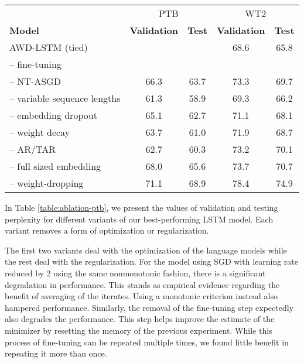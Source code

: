 \documentclass{article}
\begin{document}
\begin{table*}
\center
\begin{tabular}{l|cc|cc}
\toprule
 & \multicolumn{2}{c|}{PTB} & \multicolumn{2}{c}{WT2} \\
\bf Model & \bf Validation &  \bf Test & \bf Validation &  \bf Test \\
\midrule

AWD-LSTM (tied) &  &  & 68.6 & 65.8\\
\midrule
-- fine-tuning &  &  &  &  \\
-- NT-ASGD & 66.3 & 63.7 & 73.3 & 69.7 \\
\midrule
-- variable sequence lengths & 61.3 & 58.9 & 69.3 & 66.2 \\
-- embedding dropout & 65.1 & 62.7 & 71.1 & 68.1 \\
-- weight decay & 63.7 & 61.0 & 71.9 & 68.7 \\
-- AR/TAR & 62.7 & 60.3 & 73.2 & 70.1 \\ 
-- full sized embedding & 68.0 & 65.6 & 73.7 & 70.7 \\
-- weight-dropping & 71.1 & 68.9 & 78.4 & 74.9 \\
\bottomrule
\end{tabular}
\caption{
Model ablations for our best LSTM models reporting results over the validation and test set on Penn Treebank and WikiText-2.
Ablations are split into optimization and regularization variants, sorted according to the achieved validation perplexity on WikiText-2.
}
\label{table:ablation-ptb}
\end{table*}

In Table \ref{table:ablation-ptb}, we present the values of validation and testing perplexity for different variants of our best-performing LSTM model.
Each variant removes a form of optimization or regularization.

The first two variants deal with the optimization of the language models while the rest deal with the regularization.
For the model using SGD with learning rate reduced by 2 using the same nonmonotonic fashion, there is a significant degradation in performance.
This stands as empirical evidence regarding the benefit of averaging of the iterates.
Using a monotonic criterion instead also hampered performance.
Similarly, the removal of the fine-tuning step expectedly also degrades the performance. This step helps improve the estimate of the minimizer by resetting the memory of the previous experiment. While this process of fine-tuning can be repeated multiple times, we found little benefit in repeating it more than once.
\end{document}
